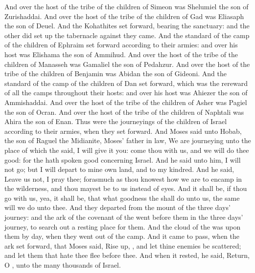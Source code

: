 \begin{biblechapter}
\verse And over the host of the tribe of the children of Simeon was Shelumiel the son of Zurishaddai.
\verse And over the host of the tribe of the children of Gad was Eliasaph the son of Deuel.
\verse And the Kohathites set forward, bearing the sanctuary: and the other did set up the tabernacle against they came.
\verse And the standard of the camp of the children of Ephraim set forward according to their armies: and over his host was Elishama the son of Ammihud.
\verse And over the host of the tribe of the children of Manasseh was Gamaliel the son of Pedahzur.
\verse And over the host of the tribe of the children of Benjamin was Abidan the son of Gideoni.
\verse And the standard of the camp of the children of Dan set forward, which was the rereward of all the camps throughout their hosts: and over his host was Ahiezer the son of Ammishaddai.
\verse And over the host of the tribe of the children of Asher was Pagiel the son of Ocran.
\verse And over the host of the tribe of the children of Naphtali was Ahira the son of Enan.
\verse Thus were the journeyings of the children of Israel according to their armies, when they set forward.
\verse And Moses said unto Hobab, the son of Raguel the Midianite, Moses' father in law, We are journeying unto the place of which the \LORD said, I will give it you: come thou with us, and we will do thee good: for the \LORD hath spoken good concerning Israel.
\verse And he said unto him, I will not go; but I will depart to mine own land, and to my kindred.
\verse And he said, Leave us not, I pray thee; forasmuch as thou knowest how we are to encamp in the wilderness, and thou mayest be to us instead of eyes.
\verse And it shall be, if thou go with us, yea, it shall be, that what goodness the \LORD shall do unto us, the same will we do unto thee.
\verse And they departed from the mount of the \LORD three days' journey: and the ark of the covenant of the \LORD went before them in the three days' journey, to search out a resting place for them.
\verse And the cloud of the \LORD was upon them by day, when they went out of the camp.
\verse And it came to pass, when the ark set forward, that Moses said, Rise up, \LORD, and let thine enemies be scattered; and let them that hate thee flee before thee.
\verse And when it rested, he said, Return, O \LORD, unto the many thousands of Israel.
\end{biblechapter}

